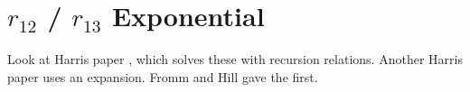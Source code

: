 \documentclass[Dissertation.tex]{subfiles}
\begin{document}
\chapter{\texorpdfstring{$r_{12}$ / $r_{13}$}{r12 / r13} Exponential}
\label{chp:Exponential}

Look at Harris paper \cite{Harris2009}, which solves these with recursion relations.
Another Harris paper \cite{Harris2003} uses an expansion.
Fromm and Hill \cite{Fromm1987} gave the first.


\label{sec:PrimeFactor}


\biblio
\end{document}
